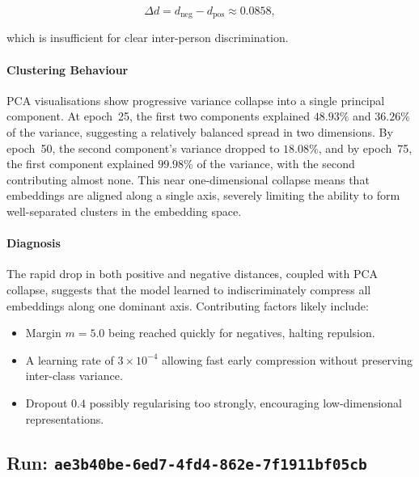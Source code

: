 \[
\Delta d = d_{\mathrm{neg}} - d_{\mathrm{pos}} \approx 0.0858,
\]

which is insufficient for clear inter-person discrimination.

\paragraph{Clustering Behaviour} 

PCA visualisations show progressive variance collapse into a single principal
component. At epoch~25, the first two components explained $48.93\%$ and
$36.26\%$ of the variance, suggesting a relatively balanced spread in two
dimensions. By epoch~50, the second component’s variance dropped to $18.08\%$,
and by epoch~75, the first component explained $99.98\%$ of the variance, with
the second contributing almost none. This near one-dimensional collapse means
that embeddings are aligned along a single axis, severely limiting the ability
to form well-separated clusters in the embedding space.

\paragraph{Diagnosis} 

The rapid drop in both positive and negative distances, coupled with PCA
collapse, suggests that the model learned to indiscriminately compress all
embeddings along one dominant axis. Contributing factors likely include:

\begin{itemize}
    \item Margin $m = 5.0$ being reached quickly for negatives, halting repulsion.
    \item A learning rate of $3 \times 10^{-4}$ allowing fast early compression without preserving inter-class variance.
    \item Dropout $0.4$ possibly regularising too strongly, encouraging low-dimensional representations.
\end{itemize}

\renewcommand{\runid}{ae3b40be-6ed7-4fd4-862e-7f1911bf05cb}

\subsection{Run: \texttt{\runid}}



